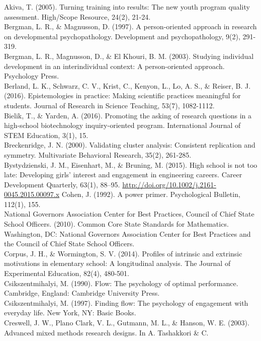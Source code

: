 \documentclass[]{msu-thesis}
\theoremstyle{definition}
\theoremstyle{definition}
\theoremstyle{definition}
\theoremstyle{remark}
\begin{document}
Akiva, T. (2005). Turning training into results: The new youth program
quality assessment. High/Scope Resource, 24(2), 21-24.\\
Bergman, L. R., \& Magnusson, D. (1997). A person-oriented approach in
research on developmental psychopathology. Development and
psychopathology, 9(2), 291-319.\\
Bergman, L. R., Magnusson, D., \& El Khouri, B. M. (2003). Studying
individual development in an interindividual context: A person-oriented
approach. Psychology Press.\\
Berland, L. K., Schwarz, C. V., Krist, C., Kenyon, L., Lo, A. S., \&
Reiser, B. J. (2016). Epistemologies in practice: Making scientific
practices meaningful for students. Journal of Research in Science
Teaching, 53(7), 1082-1112.\\
Bielik, T., \& Yarden, A. (2016). Promoting the asking of research
questions in a high-school biotechnology inquiry-oriented program.
International Journal of STEM Education, 3(1), 15.\\
Breckenridge, J. N. (2000). Validating cluster analysis: Consistent
replication and symmetry. Multivariate Behavioral Research, 35(2),
261-285.\\
Bystydzienski, J. M., Eisenhart, M., \& Bruning, M. (2015). High school
is not too late: Developing girls' interest and engagement in
engineering careers. Career Development Quarterly, 63(1), 88--95.
\url{http://doi.org/10.1002/j.2161-0045.2015.00097.x} Cohen, J. (1992).
A power primer. Psychological Bulletin, 112(1), 155.\\
National Governors Association Center for Best Practices, Council of
Chief State School Officers. (2010). Common Core State Standards for
Mathematics. Washington, DC: National Governors Association Center for
Best Practices and the Council of Chief State School Officers.\\
Corpus, J. H., \& Wormington, S. V. (2014). Profiles of intrinsic and
extrinsic motivations in elementary school: A longitudinal analysis. The
Journal of Experimental Education, 82(4), 480-501.\\
Csikszentmihalyi, M. (1990). Flow: The psychology of optimal
performance. Cambridge, England: Cambridge University Press.\\
Csikszentmihalyi, M. (1997). Finding flow: The psychology of engagement
with everyday life. New York, NY: Basic Books.\\
Creswell, J. W., Plano Clark, V. L., Gutmann, M. L., \& Hanson, W. E.
(2003). Advanced mixed methods research designs. In A. Tashakkori \& C.
\end{document}

